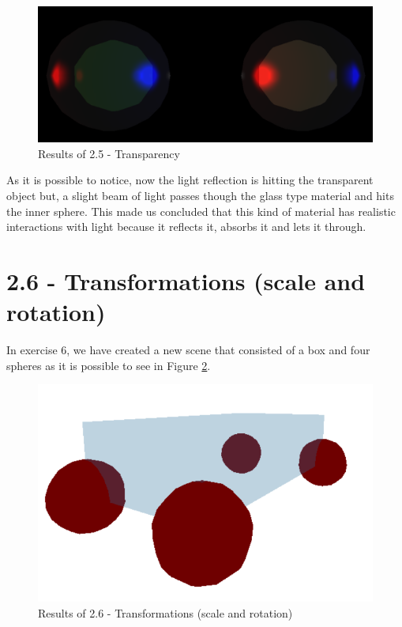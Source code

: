 \documentclass[12pt]{article}
\begin{document}
\begin{figure}[!h]
    \centering
        \includegraphics[width = \textwidth]{figs/ex_25.png}
        \caption{Results of 2.5 - Transparency}
        \label{figs:ex_25}
\end{figure}

As it is possible to notice, now the light reflection is hitting the transparent object but, a slight beam of light passes though the glass type material and hits the inner sphere. This made us concluded that this kind of material has realistic interactions with light because it reflects it, absorbs it and lets it through.

\section*{2.6 - Transformations (scale and rotation)}
\label{ex_26}

In exercise 6, we have created a new scene that consisted of a box and four spheres as it is possible to see in Figure \ref{figs:ex_26}.

\begin{figure}[!h]
    \centering
        \includegraphics[width = \textwidth]{figs/ex_26.png}
        \caption{Results of 2.6 - Transformations (scale and rotation)}
        \label{figs:ex_26}
\end{figure}
\end{document}
